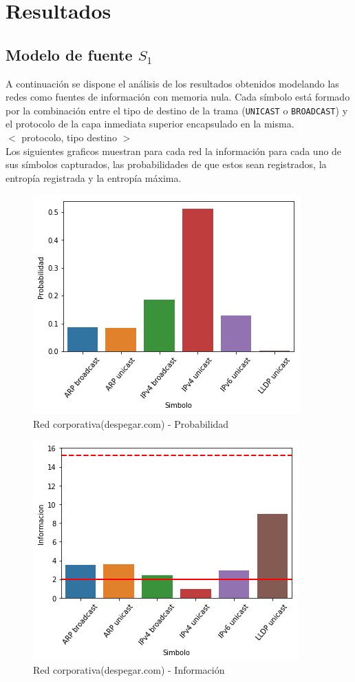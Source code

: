 \section{Resultados}

\subsection{Modelo de fuente $S_1$}

A continuación se dispone el análisis de los resultados obtenidos modelando las redes como fuentes de información con memoria nula. Cada símbolo está formado por la combinación entre el tipo de destino de la trama (\texttt{UNICAST} o \texttt{BROADCAST}) y el protocolo de la capa inmediata superior encapsulado en la misma. \\

$<$ protocolo, tipo destino $>$ \\


Los siguientes graficos muestran para cada red la información para cada uno de sus símbolos capturados, las probabilidades de que estos sean registrados, la entropía registrada y la entropía máxima.

\begin{figure}[ht]
	\centering
	\includegraphics[width=.5\linewidth]{imagenes/despegar_barras_prob}
	\caption{Red corporativa(despegar.com) - Probabilidad}
\end{figure}

\begin{figure}[ht]
	\centering
	\includegraphics[width=.5\linewidth]{imagenes/despegar_barras_info}
	\caption{Red corporativa(despegar.com) - Información}
\end{figure}

